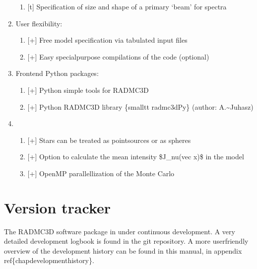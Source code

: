 \documentclass[letterpaper,10pt,english]{sphinxmanual}
\begin{document}
\begin{enumerate}
\begin{enumerate}
\item {} 
{[}t{]} Specification of size and shape of a primary ‘beam’ for spectra

\end{enumerate}

\item {} 
User flexibility:
\begin{enumerate}
%
\item {} 
{[}+{]} Free model specification via tabulated input files

\item {} 
{[}+{]} Easy special\sphinxhyphen{}purpose compilations of the code (optional)

\end{enumerate}

\item {} 
Front\sphinxhyphen{}end Python packages:
\begin{enumerate}
%
\item {} 
{[}+{]} Python simple tools for RADMC\sphinxhyphen{}3D

\item {} 
{[}+{]} Python RADMC\sphinxhyphen{}3D library \{smalltt radmc3dPy\} (author: A.\textasciitilde{}Juhasz)

\end{enumerate}

\item {} \begin{enumerate}
%
\item {} 
{[}+{]} Stars can be treated as point\sphinxhyphen{}sources or as spheres

\item {} 
{[}+{]} Option to calculate the mean intensity \$J\_nu(vec x)\$ in the model

\item {} 
{[}+{]} OpenMP parallellization of the Monte Carlo

\end{enumerate}

\end{enumerate}


\section{Version tracker}
\label{\detokenize{introduction:version-tracker}}
The RADMC\sphinxhyphen{}3D software package in under continuous development. A very
detailed development log\sphinxhyphen{}book is found in the git repository.
A more user\sphinxhyphen{}friendly overview of the development history can be
found in this manual, in appendix ref\{chap\sphinxhyphen{}development\sphinxhyphen{}history\}.
\end{document}
